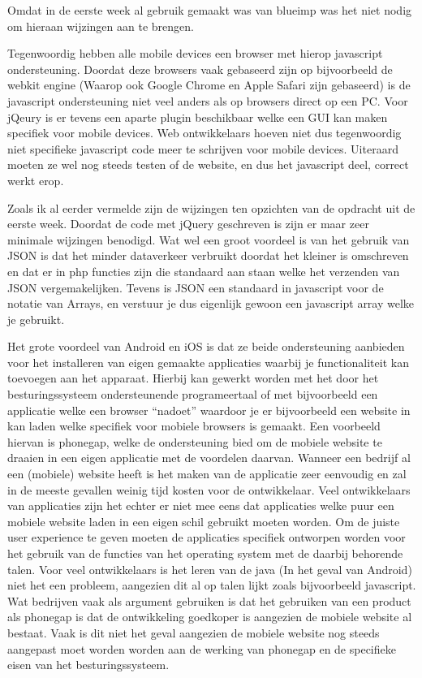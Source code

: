 Omdat in de eerste week al gebruik gemaakt was van blueimp was het niet nodig om hieraan wijzingen aan te brengen.

Tegenwoordig hebben alle mobile devices een browser met hierop javascript ondersteuning. Doordat deze browsers vaak gebaseerd zijn op bijvoorbeeld de webkit engine (Waarop ook Google Chrome en Apple Safari zijn gebaseerd) is de javascript ondersteuning niet veel anders als op browsers direct op een PC. Voor jQeury is er tevens een aparte plugin beschikbaar welke een GUI kan maken specifiek voor mobile devices. 
Web ontwikkelaars hoeven niet dus tegenwoordig niet specifieke javascript code meer te schrijven voor mobile devices. Uiteraard moeten ze wel nog steeds testen of de website, en dus het javascript deel, correct werkt erop.

Zoals ik al eerder vermelde zijn de wijzingen ten opzichten van de opdracht uit de eerste week. Doordat de code met jQuery geschreven is zijn er maar zeer minimale wijzingen benodigd. Wat wel een groot voordeel is van het gebruik van JSON is dat het minder dataverkeer verbruikt doordat het kleiner is omschreven en dat er in php functies zijn die standaard aan staan welke het verzenden van JSON vergemakelijken. Tevens is JSON een standaard in javascript voor de notatie van Arrays, en verstuur je dus eigenlijk gewoon een javascript array welke je gebruikt. 

Het grote voordeel van Android en iOS is dat ze beide ondersteuning aanbieden voor het installeren van eigen gemaakte applicaties waarbij je functionaliteit kan toevoegen aan het apparaat. Hierbij kan gewerkt worden met het door het besturingssysteem ondersteunende programeertaal of met bijvoorbeeld een applicatie welke een browser ``nadoet'' waardoor je er bijvoorbeeld een website in kan laden welke specifiek voor mobiele browsers is gemaakt. Een voorbeeld hiervan is phonegap, welke de ondersteuning bied om de mobiele website te draaien in een eigen applicatie met de voordelen daarvan. Wanneer een bedrijf al een (mobiele) website heeft is het maken van de applicatie zeer eenvoudig en zal in de meeste gevallen weinig tijd kosten voor de ontwikkelaar. 
Veel ontwikkelaars van applicaties zijn het echter er niet mee eens dat applicaties welke puur een mobiele website laden in een eigen schil gebruikt moeten worden. Om de juiste user experience te geven moeten de applicaties specifiek ontworpen worden voor het gebruik van de functies van het operating system met de daarbij behorende talen. Voor veel ontwikkelaars is het leren van de java (In het geval van Android) niet het een probleem, aangezien dit al op talen lijkt zoals bijvoorbeeld javascript. 
Wat bedrijven vaak als argument gebruiken is dat het gebruiken van een product als phonegap is dat de ontwikkeling goedkoper is aangezien de mobiele website al bestaat. Vaak is dit niet het geval aangezien de mobiele website nog steeds aangepast moet worden worden aan de werking van phonegap en de specifieke eisen van het besturingssysteem. 

